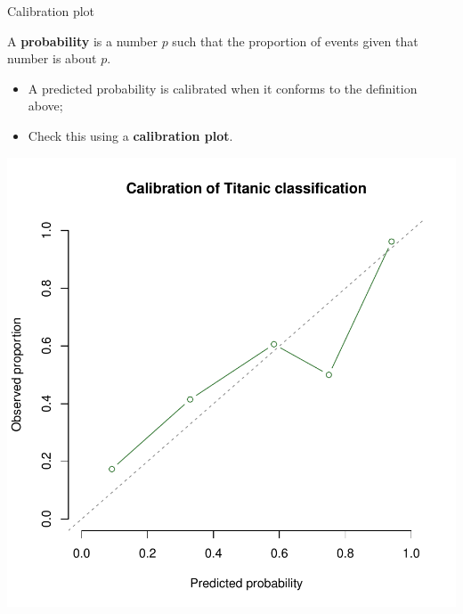 \documentclass[xcolor=table,aspectratio=169]{beamer}
\begin{document}
\begin{frame}{Calibration plot}
	\begin{definition}
		A \textbf{probability} is a number $p$ such that the proportion of events
		given that number is about $p$.
	\end{definition}
	
	\begin{itemize}
		\item A predicted probability is calibrated when it conforms to the
		definition above;
		\item Check this using a \textbf{calibration plot}.
	\end{itemize}
\end{frame}
\begin{frame}
	\includegraphics[height=\textheight]{pics/Titanic_tree_calibration}
\end{frame}
\end{document}
